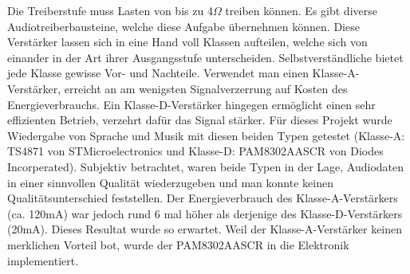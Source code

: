   Die Treiberstufe muss Lasten von bis zu 4\(\Omega\) treiben können. 
  Es gibt diverse Audiotreiberbausteine, welche diese Aufgabe übernehmen können. 
  Diese Verstärker lassen sich in eine Hand voll Klassen aufteilen, welche sich von einander in der Art ihrer Ausgangsstufe unterscheiden. 
  Selbstverständliche bietet jede Klasse gewisse Vor- und Nachteile. 
  Verwendet man einen Klasse-A-Verstärker, erreicht an am wenigsten Signalverzerrung auf Kosten des Energieverbrauchs. 
  Ein Klasse-D-Verstärker hingegen ermöglicht einen sehr effizienten Betrieb, verzehrt dafür das Signal stärker. 
  Für dieses Projekt wurde Wiedergabe von Sprache und Musik mit diesen beiden Typen getestet (Klasse-A: TS4871 von STMicroelectronics und Klasse-D: PAM8302AASCR von Diodes Incorperated). 
  Subjektiv betrachtet, waren beide Typen in der Lage, Audiodaten in einer sinnvollen Qualität wiederzugeben und man konnte keinen Qualitätsunterschied feststellen. Der Energieverbrauch des Klasse-A-Verstärkers (ca. 120mA) war jedoch rund 6 mal höher als derjenige des Klasse-D-Verstärkers (20mA).
  Dieses Resultat wurde so erwartet. Weil der Klasse-A-Verstärker keinen merklichen Vorteil bot, wurde der PAM8302AASCR in die Elektronik implementiert.
 
